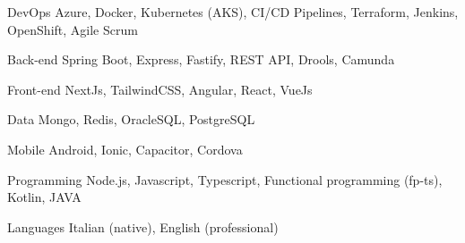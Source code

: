 

\begin{cvskills}

  \cvskill
    {DevOps} %
    {Azure, Docker, Kubernetes (AKS), CI/CD Pipelines, Terraform, Jenkins, OpenShift, Agile Scrum} %

  \cvskill
    {Back-end} %
    {Spring Boot, Express, Fastify, REST API, Drools, Camunda} %

  \cvskill
    {Front-end} %
    {NextJs, TailwindCSS, Angular, React, VueJs } %

  \cvskill
    {Data} %
    {Mongo, Redis, OracleSQL, PostgreSQL} %

  \cvskill
    {Mobile} %
    {Android, Ionic, Capacitor, Cordova} %

  \cvskill
    {Programming} %
    {Node.js, Javascript, Typescript, Functional programming (fp-ts), Kotlin, JAVA} %

  \cvskill
    {Languages} %
    {Italian (native), English (professional)} %

\end{cvskills}
